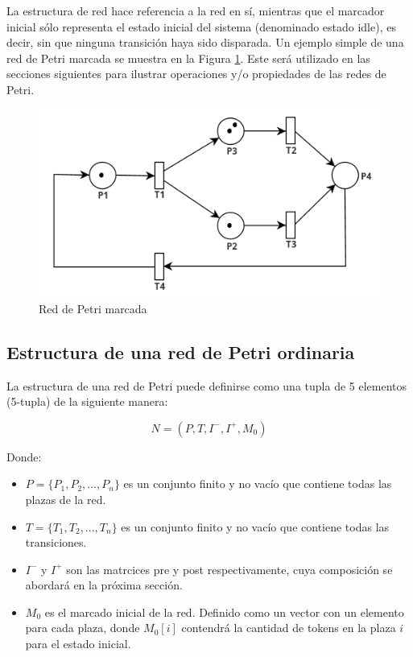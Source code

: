 La estructura de red hace referencia a la red en sí, mientras que el marcador inicial sólo representa el estado inicial del sistema (denominado estado idle), es decir, sin que ninguna transición haya sido disparada. Un ejemplo simple de una red de Petri marcada se muestra en la Figura \ref{fig:rdp_marcada}. Este será utilizado en las secciones siguientes para ilustrar operaciones y/o propiedades de las redes de Petri.

\begin{figure}[H]
    \centering
    \includegraphics[width=0.6\linewidth]{images/rdp_marcada.png}
    \caption{Red de Petri marcada}
    \label{fig:rdp_marcada}
\end{figure}

\subsection{Estructura de una red de Petri ordinaria}
La estructura de una red de Petri puede definirse como una tupla de 5 elementos (5-tupla) de la siguiente manera:

\begin{equation}
    N = (P, T, I^-, I^+, M_0)
\end{equation}

Donde:
\begin{itemize}
    \item $P = \{P_1, P_2, ..., P_n\}$ es un conjunto finito y no vacío que contiene todas las plazas de la red.
    \item $T = \{T_1, T_2, ..., T_n\}$ es un conjunto finito y no vacío que contiene todas las transiciones.
    \item $I^-$ y $I^+$ son las matrcices pre y post respectivamente, cuya composición se abordará en la próxima sección.
    \item $M_0$ es el marcado inicial de la red. Definido como un vector con un elemento para cada plaza, donde $M_0[i]$ contendrá la cantidad de tokens en la plaza $i$ para el estado inicial.
\end{itemize}

